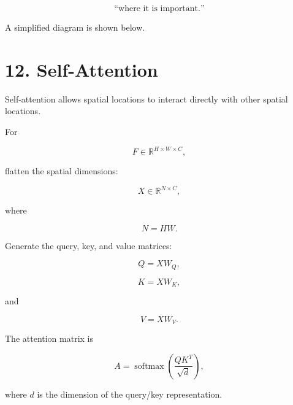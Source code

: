 \documentclass[10pt]{article}
\begin{document}
\[
\text{``where it is important.''}
\]

A simplified diagram is shown below.

\begin{center}


\end{center}

\section*{12. Self-Attention}

Self-attention allows spatial locations to interact directly with other
spatial locations.

For

\[
F\in\mathbb{R}^{H\times W\times C},
\]

flatten the spatial dimensions:

\[
X\in\mathbb{R}^{N\times C},
\]

where

\[
N=HW.
\]

Generate the query, key, and value matrices:

\[
Q=XW_Q,
\]

\[
K=XW_K,
\]

and

\[
V=XW_V.
\]

The attention matrix is

\[
A
=
\operatorname{softmax}
\left(
\frac{QK^T}{\sqrt{d}}
\right),
\]

where $d$ is the dimension of the query/key representation.
\end{document}

